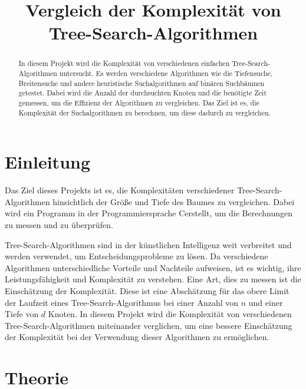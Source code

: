 \documentclass[a4paper,11pt]{article}
\title{Vergleich der Komplexität von \break Tree-Search-Algorithmen}
\author{}
\newcommand{\CC}{C\nolinebreak\hspace{-.05em}\raisebox{.4ex}{\tiny\bf +}\nolinebreak\hspace{-.10em}\raisebox{.4ex}{\tiny\bf +}\hspace{.1em}}
\begin{document}
\maketitle
\thispagestyle{empty}
\pagebreak
{}
\begin{abstract}
In diesem Projekt wird die Komplexität von verschiedenen einfachen Tree-Search-Algorithmen untersucht. Es werden verschiedene Algorithmen wie die Tiefensuche, Breitensuche und andere heuristische Suchalgorithmen auf binären Suchbäumen getestet. Dabei wird die Anzahl der durchsuchten Knoten und die benötigte Zeit gemessen, um die Effizienz der Algorithmen zu vergleichen. Das Ziel ist es, die Komplexität der Suchalgorithmen zu berechnen, um diese dadurch zu vergleichen.
\end{abstract}
\pagebreak
\tableofcontents
\pagebreak


\section{Einleitung}
Das Ziel dieses Projekts ist es, die Komplexitäten verschiedener Tree-Search-Algorithmen hinsichtlich der Größe und Tiefe des Baumes zu vergleichen. Dabei wird ein Programm in der Programmiersprache \CC erstellt, um die Berechnungen zu messen und zu überprüfen. 

Tree-Search-Algorithmen sind in der künstlichen Intelligenz weit verbreitet und werden verwendet, um Entscheidungsprobleme zu lösen. Da verschiedene Algorithmen unterschiedliche Vorteile und Nachteile aufweisen, ist es wichtig, ihre Leistungsfähigkeit und Komplexität zu verstehen. Eine Art, dies zu messen ist die Einschätzung der Komplexität. Diese ist eine Abschätzung für das obere Limit der Laufzeit eines Tree-Search-Algorithmus bei einer Anzahl von $n$ und einer Tiefe von $d$ Knoten. In diesem Projekt wird die Komplexität von verschiedenen Tree-Search-Algorithmen miteinander verglichen, um eine bessere Einschätzung der Komplexität bei der Verwendung dieser Algorithmen zu ermöglichen.


\section{Theorie}
\end{document}
